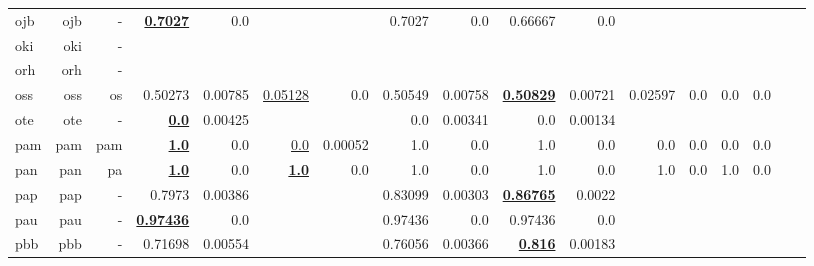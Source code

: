 \documentclass[11pt]{article}
\begin{document}
\begin{table*}[h]
{\begin{tabular}{lrrrrrrrrrrrrrrrr}
ojb         & ojb         & -         & \textbf{\underline{0.7027}}         & 0.0         &          &          & 0.7027         & 0.0         & 0.66667         & 0.0         &          &          &          &          \\
oki         & oki         & -         &          &          &          &          &          &          &          &          &          &          &          &          \\
orh         & orh         & -         &          &          &          &          &          &          &          &          &          &          &          &          \\
oss         & oss         & os         & 0.50273         & 0.00785         & \underline{0.05128}         & 0.0         & 0.50549         & 0.00758         & \textbf{\underline{0.50829}}         & 0.00721         & 0.02597         & 0.0         & 0.0         & 0.0         \\
ote         & ote         & -         & \textbf{\underline{0.0}}         & 0.00425         &          &          & 0.0         & 0.00341         & 0.0         & 0.00134         &          &          &          &          \\
pam         & pam         & pam         & \textbf{\underline{1.0}}         & 0.0         & \underline{0.0}         & 0.00052         & 1.0         & 0.0         & 1.0         & 0.0         & 0.0         & 0.0         & 0.0         & 0.0         \\
pan         & pan         & pa         & \textbf{\underline{1.0}}         & 0.0         & \textbf{\underline{1.0}}         & 0.0         & 1.0         & 0.0         & 1.0         & 0.0         & 1.0         & 0.0         & 1.0         & 0.0         \\
pap         & pap         & -         & 0.7973         & 0.00386         &          &          & 0.83099         & 0.00303         & \textbf{\underline{0.86765}}         & 0.0022         &          &          &          &          \\
pau         & pau         & -         & \textbf{\underline{0.97436}}         & 0.0         &          &          & 0.97436         & 0.0         & 0.97436         & 0.0         &          &          &          &          \\
pbb         & pbb         & -         & 0.71698         & 0.00554         &          &          & 0.76056         & 0.00366         & \textbf{\underline{0.816}}         & 0.00183         &          &          &          &          \\

\end{tabular}}
\end{table*}
\end{document}
